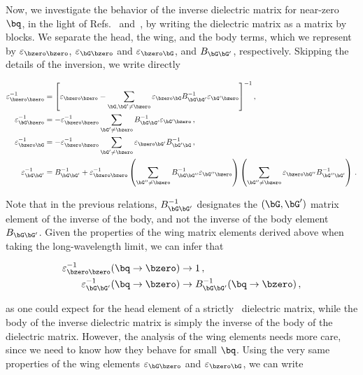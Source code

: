 Now, we investigate the behavior of the inverse dielectric matrix for near-zero $\bq$, in the light of Refs.~\cite{Rasmussen_Schmidt_Winther_Thygesen_2016} and~\cite{Pick_Cohen_Martin_1970}, by writing the dielectric matrix as a matrix by blocks.
We separate the head, the wing, and the body terms, which we represent by $\varepsilon_{\bzero \bzero}$, $\varepsilon_{\bG \bzero}$ and $\varepsilon_{\bzero \bG}$, and $B_{\bG \bG'}$, respectively.
Skipping the details of the inversion, we write directly

\begin{align}
    \varepsilon^{-1}_{\bzero \bzero}       & =  \left[\varepsilon_{\bzero \bzero} - \sum_{\bG,\bG' \neq \bzero} \varepsilon_{\bzero \bG} B^{-1}_{\bG \bG'} \varepsilon_{\bG'\bzero}\right]^{-1} , \\
    \varepsilon^{-1}_{\bG \bzero}     & =  -\varepsilon^{-1}_{\bzero \bzero} \sum_{\bG' \neq \bzero}  B^{-1}_{\bG \bG'}  \varepsilon_{\bG' \bzero}\,, \\
    \varepsilon^{-1}_{\bzero \bG}     & =  -\varepsilon^{-1}_{\bzero \bzero} \sum_{\bG' \neq \bzero}  \varepsilon_{\bzero\bG'} B^{-1}_{\bG' \bG} \,, \\
    \varepsilon^{-1}_{\bG \bG'} & =  B^{-1}_{\bG \bG'} + \varepsilon^{-1}_{\bzero \bzero} \left(\sum_{\bG'' \neq \bzero}  B^{-1}_{\bG \bG''}  \varepsilon_{\bG'' \bzero}\right) \left(\sum_{\bG'' \neq \bzero} \varepsilon_{\bzero\bG''} B^{-1}_{\bG'' \bG'}\right) \,.
\end{align}

\noindent Note that in the previous relations, $B^{-1}_{\bG \bG'}$ designates the $(\bG,\bG')$ matrix element of the inverse of the body, and not the inverse of the body element $B_{\bG \bG'}$.
Given the properties of the wing matrix elements derived above when taking the long-wavelength limit, we can infer that

\begin{align}
     \varepsilon^{-1}_{\bzero \bzero} (\bq \to \bzero) &\to 1 \,, \\
     \varepsilon^{-1}_{\bG \bG'} (\bq \to \bzero) &\to B^{-1}_{\bG \bG'}(\bq \to \bzero) \,,
\end{align}

\noindent as one could expect for the head element of a strictly \bd~dielectric matrix, while the body of the inverse dielectric matrix is simply the inverse of the body of the dielectric matrix.
However, the analysis of the wing elements needs more care, since we need to know how they behave for small $\bq$.
Using the very same properties of the wing elements $\varepsilon_{\bG \bzero}$ and $\varepsilon_{\bzero \bG}$, we can write

